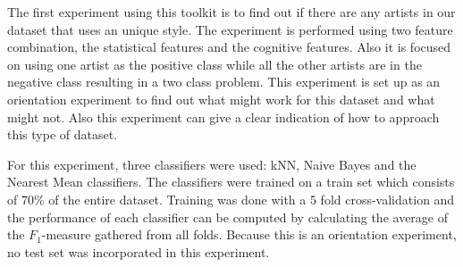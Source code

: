The first experiment using this toolkit is to find out if there are any artists in our dataset that uses an unique style.
The experiment is performed using two feature combination, the statistical features and the cognitive features.
Also it is focused on using one artist as the positive class while all the other artists are in the negative class resulting in a two class problem.
This experiment is set up as an orientation experiment to find out what might work for this dataset and what might not.
Also this experiment can give a clear indication of how to approach this type of dataset.

For this experiment, three classifiers were used: kNN, Naive Bayes and the Nearest Mean classifiers.
The classifiers were trained on a train set which consists of 70\% of the entire dataset.
Training was done with a 5 fold cross-validation and the performance of each classifier can be computed by calculating the average of the $F_1$-measure gathered from all folds.
Because this is an orientation experiment, no test set was incorporated in this experiment.



